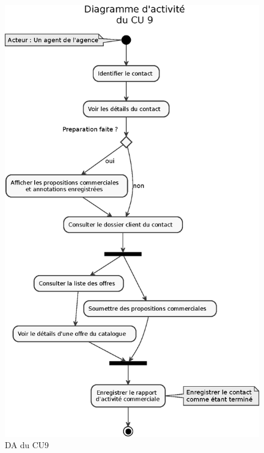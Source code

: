 \begin{figure}[H]
\centering
\includegraphics[width=13cm]{figures/eps/DA_CU9.eps}
\caption{DA du CU9}
\end{figure}

